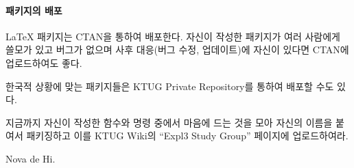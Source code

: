 \documentclass[a4paper,amsmath]{oblivoir}
\begin{document}

\paragraph{패키지의 배포}

\LaTeX{} 패키지는 CTAN을 통하여 배포한다. 자신이 작성한 패키지가 여러 사람에게
쓸모가 있고 버그가 없으며 사후 대응(버그 수정, 업데이트)에 자신이 있다면
CTAN에 업로드하여도 좋다.

한국적 상황에 맞는 패키지들은 KTUG Private Repository를 통하여 배포할 수도 있다.


\vfill

\begin{questionp}
지금까지 자신이 작성한 함수와 명령 중에서 마음에 드는 것을 모아 자신의 이름을 붙여서 패키징하고
이를 KTUG Wiki의 “Expl3 Study Group” 페이지에 업로드하여라.
\end{questionp}





\vfill
\hfill Nova de Hi.
\end{document}

